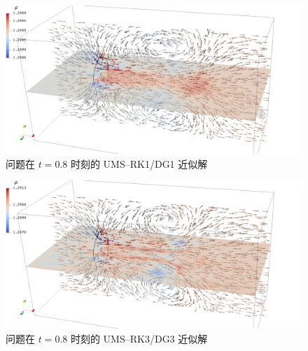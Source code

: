 \begin{figure}[h!]
\begin{centering}
\includegraphics[width=1\textwidth,height=0.26\textheight,keepaspectratio]{figures/upward/p=1/Frame80}
\par\end{centering}
\caption{\label{fig:upward_t=00003D8e-1_p=00003D1}问题在
$t=0.8$ 时刻的 UMS–RK1/DG1 近似解}
\end{figure}

\begin{figure}[h!]
\begin{centering}
\includegraphics[width=1\textwidth,height=0.26\textheight,keepaspectratio]{figures/upward/p=3/Frame80}
\par\end{centering}
\caption{\label{fig:upward_t=00003D8e-1_p=00003D3}问题在
$t=0.8$ 时刻的 UMS–RK3/DG3 近似解}
\end{figure}

